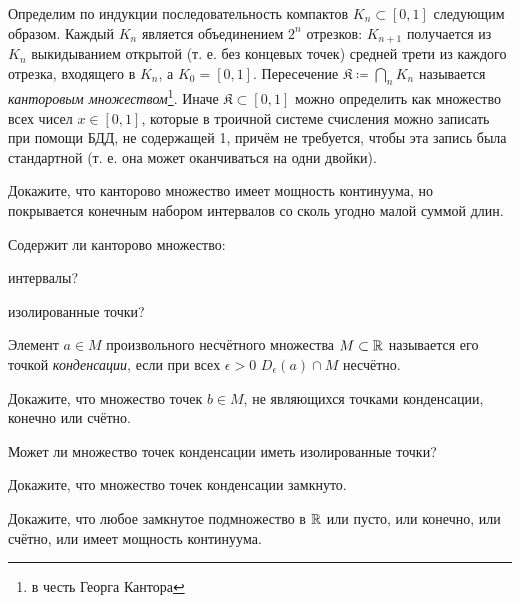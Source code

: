\documentclass[a4paper, 12pt, num=27]{listok}
\begin{document}
\begin{definition}
	Определим по индукции последовательность компактов $K_n \subset \left [ 0, 1 \right ]$ следующим образом.
	Каждый $K_n$ является объединением $2^n$ отрезков: $K_{n + 1}$ получается из $K_n$ выкидыванием открытой
	(т. е. без концевых точек) средней трети из каждого отрезка, входящего в $K_n$, а $K_0 = \left [ 0, 1 \right ]$.
	Пересечение $\mathfrak{K} \coloneq \bigcap_n K_n$ называется \textit{канторовым множеством}\footnote{%
	в честь Георга Кантора
	}.
	Иначе $\mathfrak{K} \subset \left [ 0, 1 \right ]$ можно определить как множество всех чисел $x \in \left [ 0, 1 \right ]$,
	которые в троичной системе счисления можно записать при помощи БДД, не содержащей 1, причём не требуется, чтобы эта запись была стандартной
	(т. е. она может оканчиваться на одни двойки).
\end{definition}
\begin{problem}
	Докажите, что канторово множество имеет мощность континуума, но покрывается конечным набором интервалов со сколь угодно малой суммой длин.
\end{problem}
\begin{problem}
	Содержит ли канторово множество:
	\begin{probparts}
		\item интервалы?
		\item изолированные точки?
	\end{probparts}
\end{problem}
\begin{definition}
	Элемент $a \in M$ произвольного несчётного множества $M \subset \mathbb{R}$ называется его точкой \textit{конденсации}, если
	при всех $\epsilon > 0$ $D_{\epsilon}(a) \cap M$ несчётно.
\end{definition}
\begin{problem}[\hard]
	Докажите, что множество точек $b \in M$, не являющихся точками конденсации, конечно или счётно.
\end{problem}
\begin{problem}[\hard]
	Может ли множество точек конденсации иметь изолированные точки?
\end{problem}
\begin{problem}[\hard]
	Докажите, что множество точек конденсации замкнуто.
\end{problem}
\begin{problem}[\hard]
	Докажите, что любое замкнутое подмножество в $\mathbb{R}$ или пусто, или конечно, или счётно, или имеет мощность континуума.
\end{problem}
\end{document}
